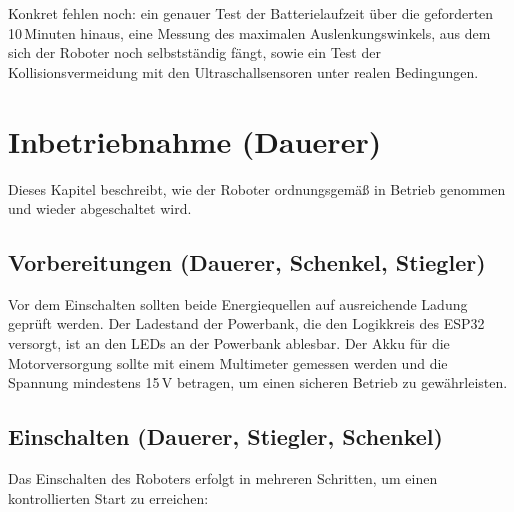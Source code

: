 \documentclass[fontsize=12pt,
parskip=half,	%
department=FakM,  %
logostyle=flat,
twoside, %
DIV=15,BCOR=10mm, %
]{OTHRreprt}
\begin{document}
Konkret fehlen noch: ein genauer Test der Bat\-te\-rie\-lauf\-zeit über die geforderten 10\,Minuten hinaus, eine Messung des maximalen Aus\-len\-kungs\-win\-kels, aus dem sich der Roboter noch selbst\-stän\-dig fängt, sowie ein Test der Kol\-li\-si\-ons\-ver\-mei\-dung mit den Ul\-tra\-schall\-sen\-so\-ren unter realen Bedingungen.

\chapter{Inbetriebnahme (Dauerer)}
\label{ch:inbetriebnahme}

Dieses Kapitel beschreibt, wie der Roboter ordnungsgemäß in Betrieb genommen und wieder abgeschaltet wird.

\section{Vorbereitungen (Dauerer, Schenkel, Stiegler)}
\label{sec:inbetrieb_vorbereitung}

Vor dem Einschalten sollten beide Energiequellen auf ausreichende Ladung geprüft werden. Der Ladestand der Powerbank, die den Logikkreis des ESP32 versorgt, ist an den LEDs an der Powerbank ablesbar. Der Akku für die Motorversorgung sollte mit einem Multimeter gemessen werden und die Spannung mindestens 15\,V betragen, um einen sicheren Betrieb zu gewährleisten.

\section{Einschalten (Dauerer, Stiegler, Schenkel)}
\label{sec:inbetrieb_einschalten}

Das Einschalten des Roboters erfolgt in mehreren Schritten, um einen kontrollierten Start zu erreichen:
\end{document}
